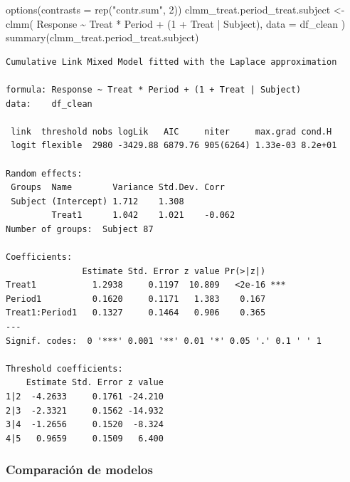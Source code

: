 \documentclass[
  12pt,
  a4paper,
  extrafontsizes,
  onecolumn,
  openright,
  table]{memoir}
\newenvironment{Shaded}{\begin{snugshade}}{\end{snugshade}}
\newcommand{\AttributeTok}[1]{\textcolor[rgb]{0.40,0.45,0.13}{#1}}
\newcommand{\DecValTok}[1]{\textcolor[rgb]{0.68,0.00,0.00}{#1}}
\newcommand{\FunctionTok}[1]{\textcolor[rgb]{0.28,0.35,0.67}{#1}}
\newcommand{\NormalTok}[1]{\textcolor[rgb]{0.00,0.23,0.31}{#1}}
\newcommand{\OtherTok}[1]{\textcolor[rgb]{0.00,0.23,0.31}{#1}}
\newcommand{\SpecialCharTok}[1]{\textcolor[rgb]{0.37,0.37,0.37}{#1}}
\newcommand{\StringTok}[1]{\textcolor[rgb]{0.13,0.47,0.30}{#1}}
\begin{document}
\scriptsize

\begin{Shaded}
\begin{Highlighting}[]
\FunctionTok{options}\NormalTok{(}\AttributeTok{contrasts =} \FunctionTok{rep}\NormalTok{(}\StringTok{"contr.sum"}\NormalTok{, }\DecValTok{2}\NormalTok{))}
\NormalTok{clmm\_treat.period\_treat.subject }\OtherTok{\textless{}{-}} \FunctionTok{clmm}\NormalTok{(}
\NormalTok{    Response }\SpecialCharTok{\textasciitilde{}}\NormalTok{ Treat }\SpecialCharTok{*}\NormalTok{ Period }\SpecialCharTok{+}\NormalTok{ (}\DecValTok{1} \SpecialCharTok{+}\NormalTok{ Treat }\SpecialCharTok{|}\NormalTok{ Subject),}
    \AttributeTok{data =}\NormalTok{ df\_clean}
\NormalTok{)}
\FunctionTok{summary}\NormalTok{(clmm\_treat.period\_treat.subject)}
\end{Highlighting}
\end{Shaded}

\begin{verbatim}
Cumulative Link Mixed Model fitted with the Laplace approximation

formula: Response ~ Treat * Period + (1 + Treat | Subject)
data:    df_clean

 link  threshold nobs logLik   AIC     niter     max.grad cond.H 
 logit flexible  2980 -3429.88 6879.76 905(6264) 1.33e-03 8.2e+01

Random effects:
 Groups  Name        Variance Std.Dev. Corr   
 Subject (Intercept) 1.712    1.308           
         Treat1      1.042    1.021    -0.062 
Number of groups:  Subject 87 

Coefficients:
               Estimate Std. Error z value Pr(>|z|)    
Treat1           1.2938     0.1197  10.809   <2e-16 ***
Period1          0.1620     0.1171   1.383    0.167    
Treat1:Period1   0.1327     0.1464   0.906    0.365    
---
Signif. codes:  0 '***' 0.001 '**' 0.01 '*' 0.05 '.' 0.1 ' ' 1

Threshold coefficients:
    Estimate Std. Error z value
1|2  -4.2633     0.1761 -24.210
2|3  -2.3321     0.1562 -14.932
3|4  -1.2656     0.1520  -8.324
4|5   0.9659     0.1509   6.400
\end{verbatim}

\normalsize

\hypertarget{comparaciuxf3n-de-modelos}{%
\subsubsection{Comparación de modelos}\label{comparaciuxf3n-de-modelos}}
\end{document}
